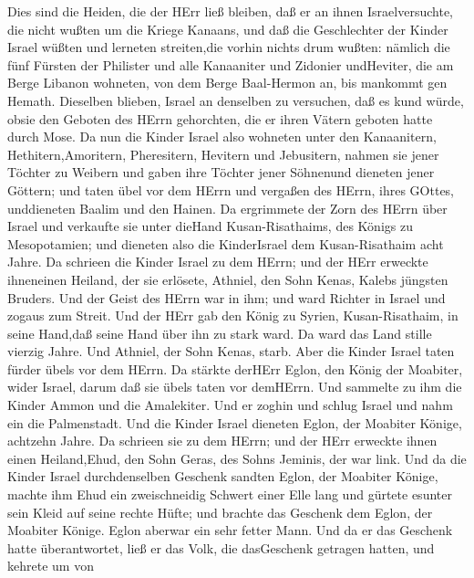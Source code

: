  Dies sind die Heiden, die der HErr ließ bleiben, daß er an
ihnen Israelversuchte, die nicht wußten um die Kriege Kanaans,
 und daß die Geschlechter der Kinder Israel wüßten und
lerneten streiten,die vorhin nichts drum wußten:  nämlich
die fünf Fürsten der Philister und alle Kanaaniter und Zidonier
undHeviter, die am Berge Libanon wohneten, von dem Berge Baal-Hermon an,
bis mankommt gen Hemath.  Dieselben blieben, Israel an
denselben zu versuchen, daß es kund würde, obsie den Geboten des HErrn
gehorchten, die er ihren Vätern geboten hatte durch Mose. 
Da nun die Kinder Israel also wohneten unter den Kanaanitern,
Hethitern,Amoritern, Pheresitern, Hevitern und Jebusitern, 
nahmen sie jener Töchter zu Weibern und gaben ihre Töchter jener
Söhnenund dieneten jener Göttern;  und taten übel vor dem
HErrn und vergaßen des HErrn, ihres GOttes, unddieneten Baalim und den
Hainen.  Da ergrimmete der Zorn des HErrn über Israel und
verkaufte sie unter dieHand Kusan-Risathaims, des Königs zu
Mesopotamien; und dieneten also die KinderIsrael dem Kusan-Risathaim
acht Jahre.  Da schrieen die Kinder Israel zu dem HErrn; und
der HErr erweckte ihneneinen Heiland, der sie erlösete, Athniel, den
Sohn Kenas, Kalebs jüngsten Bruders.  Und der Geist des
HErrn war in ihm; und ward Richter in Israel und zogaus zum Streit. Und
der HErr gab den König zu Syrien, Kusan-Risathaim, in seine Hand,daß
seine Hand über ihn zu stark ward.  Da ward das Land stille
vierzig Jahre. Und Athniel, der Sohn Kenas, starb.  Aber
die Kinder Israel taten fürder übels vor dem HErrn. Da stärkte derHErr
Eglon, den König der Moabiter, wider Israel, darum daß sie übels taten
vor demHErrn.  Und sammelte zu ihm die Kinder Ammon und die
Amalekiter. Und er zoghin und schlug Israel und nahm ein die
Palmenstadt.  Und die Kinder Israel dieneten Eglon, der
Moabiter Könige, achtzehn Jahre.  Da schrieen sie zu dem
HErrn; und der HErr erweckte ihnen einen Heiland,Ehud, den Sohn Geras,
des Sohns Jeminis, der war link. Und da die Kinder Israel durchdenselben
Geschenk sandten Eglon, der Moabiter Könige,  machte ihm
Ehud ein zweischneidig Schwert einer Elle lang und gürtete esunter sein
Kleid auf seine rechte Hüfte;  und brachte das Geschenk dem
Eglon, der Moabiter Könige. Eglon aberwar ein sehr fetter Mann.
 Und da er das Geschenk hatte überantwortet, ließ er das
Volk, die dasGeschenk getragen hatten,  und kehrete um von
